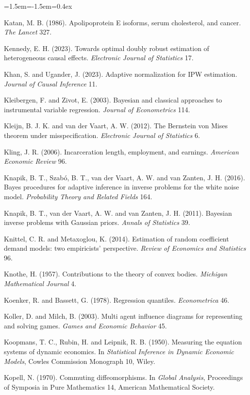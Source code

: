 \begin{list}{}{\leftmargin=1.5em\itemindent=-1.5em\itemsep=0.4ex}
\item Katan, M. B. (1986). Apolipoprotein E isoforms, serum cholesterol, and cancer. \emph{The Lancet} 327.
\item Kennedy, E. H. (2023). Towards optimal doubly robust estimation of heterogeneous causal effects. \emph{Electronic Journal of Statistics} 17.
\item Khan, S. and Ugander, J. (2023). Adaptive normalization for IPW estimation. \emph{Journal of Causal Inference} 11.
\item Kleibergen, F. and Zivot, E. (2003). Bayesian and classical approaches to instrumental variable regression. \emph{Journal of Econometrics} 114.
\item Kleijn, B. J. K. and van der Vaart, A. W. (2012). The Bernstein von Mises theorem under misspecification. \emph{Electronic Journal of Statistics} 6.
\item Kling, J. R. (2006). Incarceration length, employment, and earnings. \emph{American Economic Review} 96.
\item Knapik, B. T., Szab\'o, B. T., van der Vaart, A. W. and van Zanten, J. H. (2016). Bayes procedures for adaptive inference in inverse problems for the white noise model. \emph{Probability Theory and Related Fields} 164.
\item Knapik, B. T., van der Vaart, A. W. and van Zanten, J. H. (2011). Bayesian inverse problems with Gaussian priors. \emph{Annals of Statistics} 39.
\item Knittel, C. R. and Metaxoglou, K. (2014). Estimation of random coefficient demand models: two empiricists' perspective. \emph{Review of Economics and Statistics} 96.
\item Knothe, H. (1957). Contributions to the theory of convex bodies. \emph{Michigan Mathematical Journal} 4.
\item Koenker, R. and Bassett, G. (1978). Regression quantiles. \emph{Econometrica} 46.
\item Koller, D. and Milch, B. (2003). Multi agent influence diagrams for representing and solving games. \emph{Games and Economic Behavior} 45.
\item Koopmans, T. C., Rubin, H. and Leipnik, R. B. (1950). Measuring the equation systems of dynamic economics. In \emph{Statistical Inference in Dynamic Economic Models}, Cowles Commission Monograph 10, Wiley.
\item Kopell, N. (1970). Commuting diffeomorphisms. In \emph{Global Analysis}, Proceedings of Symposia in Pure Mathematics 14, American Mathematical Society.

\end{list}
